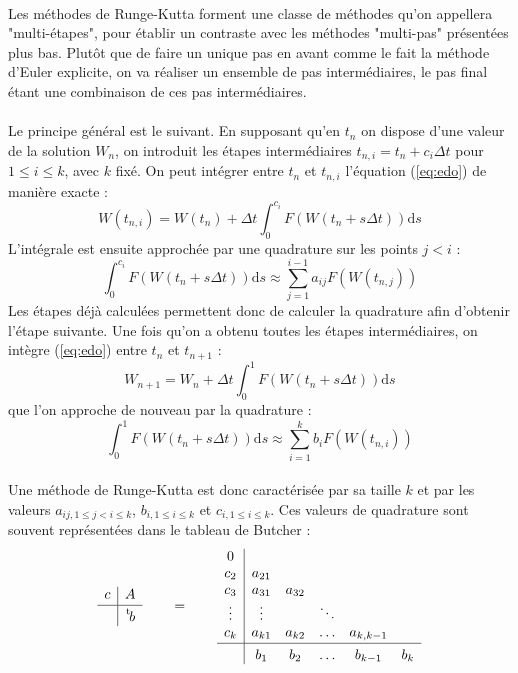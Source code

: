     \paragraph{}
    Les méthodes de Runge-Kutta forment une classe de méthodes qu'on appellera "multi-étapes", pour établir un contraste avec les méthodes "multi-pas" présentées plus bas.
    Plutôt que de faire un unique pas en avant comme le fait la méthode d'Euler explicite, on va réaliser un ensemble de pas intermédiaires, le pas final étant une combinaison de ces pas intermédiaires.

    \paragraph{}
    Le principe général est le suivant.
    En supposant qu'en $t_n$ on dispose d'une valeur de la solution $W_n$, on introduit les étapes intermédiaires $t_{n,i} = t_n + c_i\Delta t$ pour $1\leq i\leq k$, avec $k$ fixé.
    On peut intégrer entre $t_n$ et $t_{n,i}$ l'équation (\ref{eq:edo}) de manière exacte :
    \[W\left(t_{n,i}\right) = W\left(t_n\right) + \Delta t \int_0^{c_i}F\left(W\left(t_n + s\Delta t\right)\right)\mathrm{d}s\]
    L'intégrale est ensuite approchée par une quadrature sur les points $j<i$ :
    \[\int_0^{c_i}F\left(W\left(t_n + s\Delta t\right)\right)\mathrm{d}s \approx \sum_{j = 1}^{i-1}a_{ij}F\left(W\left(t_{n,j}\right)\right)\]
    Les étapes déjà calculées permettent donc de calculer la quadrature afin d'obtenir l'étape suivante.
    Une fois qu'on a obtenu toutes les étapes intermédiaires, on intègre (\ref{eq:edo}) entre $t_n$ et $t_{n+1}$ :
    \[W_{n+1} = W_n + \Delta t \int_0^1F\left(W\left(t_n + s\Delta t\right)\right)\mathrm{d}s\]
    que l'on approche de nouveau par la quadrature :
    \[\int_0^1F\left(W\left(t_n + s\Delta t\right)\right)\mathrm{d}s \approx \sum_{i = 1}^kb_iF\left(W\left(t_{n,i}\right)\right)\]

    \paragraph{}
    Une méthode de Runge-Kutta est donc caractérisée par sa taille $k$ et par les valeurs $a_{ij, 1\leq j<i\leq k}$, $b_{i, 1\leq i\leq k}$ et $c_{i, 1\leq i\leq k}$.
    Ces valeurs de quadrature sont souvent représentées dans le tableau de Butcher :
    \[
    \begin{array}{c|c}
      c & A \rule[-1.1ex]{0pt}{0pt} \RKBar \transpose{b}
    \end{array}
    \qquad = \qquad
    \begin{array}{c|ccccc}
      0\\
      c_2    & a_{21} \\
      c_3    & a_{31} & a_{32} \\
      \vdots & \vdots &        & \ddots\\
      c_k    & a_{k1} & a_{k2} & \hdots & a_{k,k-1} \RKBar
      b_1    & b_2    & \hdots & b_{k-1} & b_k
    \end{array}
    \]

